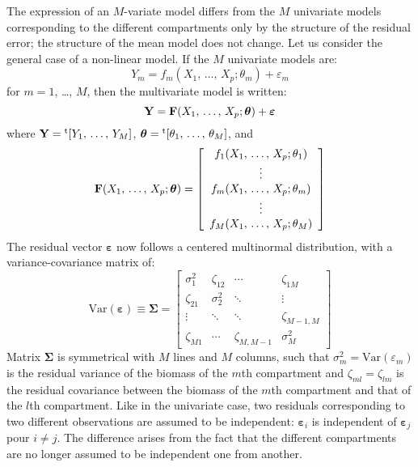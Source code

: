 The expression of an $M$-variate model differs from the $M$ univariate models corresponding to the different compartments only by the structure of the residual error; the structure of the mean model does not change. Let us consider the general case of a non-linear model. If the $M$ univariate models are:
\begin{equation}
Y_m=f_m(X_1,\,\ldots,\,X_p;\theta_m)+\varepsilon_m\label{uvar}
\end{equation}
for $m=1$, \ldots, $M$, then the multivariate model is written:
\[
\mathbf{Y}=\mathbf{F}(X_1,\,\ldots,\,X_p;\boldsymbol{\theta})+
\boldsymbol{\varepsilon}
\]
where $\mathbf{Y}={}^{\mathrm{t}}[Y_1,\,\ldots,\,Y_M]$,
$\boldsymbol{\theta}={}^{\mathrm{t}}[\theta_1,\,\ldots,\,\theta_M]$, and
\begin{equation}
\mathbf{F}(X_1,\,\ldots,\,X_p;\boldsymbol{\theta})=\left[
\begin{array}{c}
f_1(X_1,\,\ldots,\,X_p;\theta_1)
\\\vdots\\
f_m(X_1,\,\ldots,\,X_p;\theta_m)
\\\vdots\\
f_M(X_1,\,\ldots,\,X_p;\theta_M)
\end{array}
\right]\label{mvar}
\end{equation}
The residual vector $\boldsymbol{\varepsilon}$ now follows a centered multinormal distribution, with a variance-covariance matrix of:
\[
\mathrm{Var}(\boldsymbol{\varepsilon})\equiv\boldsymbol{\Sigma}
=\left[
\begin{array}{cccc}
\sigma_1^2 & \zeta_{12} & \cdots        & \zeta_{1M}\\ %
\zeta_{21} & \sigma_2^2 & \ddots        & \vdots\\ %
\vdots     & \ddots     & \ddots        & \zeta_{M-1,M}\\ %
\zeta_{M1} & \cdots     & \zeta_{M,M-1} & \sigma_M^2
\end{array}
\right]
\]
Matrix $\boldsymbol{\Sigma}$ is symmetrical with $M$ lines and $M$ columns, such that $\sigma_m^2=\mathrm{Var}(\varepsilon_m)$ is the residual variance of the biomass of the $m$th compartment and $\zeta_{ml}=\zeta_{lm}$ is the residual covariance between the biomass of the $m$th compartment and that of the $l$th compartment. Like in the univariate case, two residuals corresponding to two different observations are assumed to be independent: $\boldsymbol{\varepsilon}_i$ is independent of $\boldsymbol{\varepsilon}_j$ pour $i\neq j$. The difference arises from the fact that the different compartments are no longer assumed to be independent one from another.

